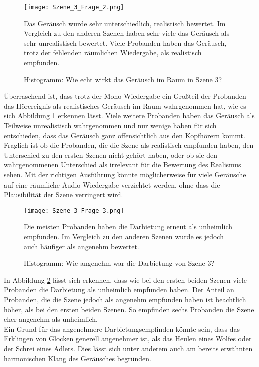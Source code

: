 \begin{figure}[H]
\centering
\texttt{[image: Szene\_3\_Frage\_2.png]}
\caption{Histogramm: Wie echt wirkt das Geräusch im Raum in Szene 3?}
Das Geräusch wurde sehr unterschiedlich, realistisch bewertet. Im Vergleich zu den anderen Szenen haben sehr viele das Geräusch als sehr unrealistisch bewertet. Viele Probanden haben das Geräusch, trotz der fehlenden räumlichen Wiedergabe, als realistisch empfunden.

\label{fig:Szene_3_Frage2}
\end{figure} 
\vspace*{30pt}

Überraschend ist, dass trotz der Mono-Wiedergabe ein Großteil der Probanden das Hörereignis als realistisches Geräusch im Raum wahrgenommen hat, wie es sich Abbildung \ref{fig:Szene_3_Frage2} erkennen lässt. Viele weitere Probanden haben das Geräusch als Teilweise unrealistisch wahrgenommen und nur wenige haben für sich entschieden, dass das Geräusch ganz offensichtlich aus den Kopfhörern kommt.\\

 Fraglich ist ob die Probanden, die die Szene als realistisch empfunden haben, den Unterschied zu den ersten Szenen nicht gehört haben, oder ob sie den wahrgenommenen Unterschied als irrelevant für die Bewertung des Realismus sehen. Mit der richtigen Ausführung könnte möglicherweise für viele Geräusche auf eine räumliche Audio-Wiedergabe verzichtet werden, ohne dass die Plausibilität der Szene verringert wird. 

 \begin{figure}[H]
\centering
\texttt{[image: Szene\_3\_Frage\_3.png]}
\caption{Histogramm: Wie angenehm war die Darbietung von Szene 3?}
Die meisten Probanden haben die Darbietung erneut als unheimlich empfunden. Im Vergleich zu den anderen Szenen wurde es jedoch auch häufiger als angenehm bewertet.
\label{fig:Szene_3_Frage3}
\end{figure} 


In Abbildung \ref{fig:Szene_3_Frage3} lässt sich erkennen, dass wie bei den ersten beiden Szenen viele Probanden die Darbietung als unheimlich empfunden haben. Der Anteil an Probanden, die die Szene jedoch als angenehm empfunden haben ist beachtlich höher, als bei den ersten beiden Szenen. So empfinden sechs Probanden die Szene eher angenehm als unheimlich. \\

Ein Grund für das angenehmere Darbietungsempfinden könnte sein, dass das Erklingen von Glocken generell angenehmer ist, als das Heulen eines Wolfes oder der Schrei eines Adlers. Dies lässt sich unter anderem auch am bereits erwähnten harmonischen Klang des Geräusches  begründen.  \\

